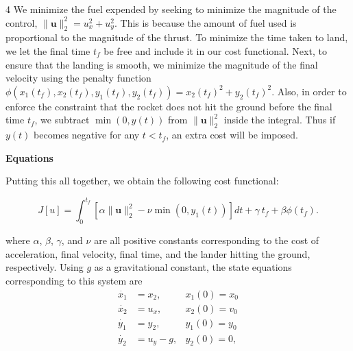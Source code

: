 \documentclass[a0]{4by3}
\newcommand{\NumColumns}{4}
\begin{document}
\begin{minipage}{\linewidth + 2\fboxsep}
\begin{multicols*}{\NumColumns}
            We minimize the fuel expended by seeking to minimize the magnitude of the control, $\|\mathbf{u}\|_2^2 = u_x^2 + u_y^2$.
            This is because the amount of fuel used is proportional to the magnitude of the thrust.
            To minimize the time taken to land, we let the final time $t_f$ be free and include it in our cost functional.
            Next, to ensure that the landing is smooth, we minimize the magnitude of the final velocity using the penalty function $\phi(x_1(t_f), x_2(t_f), y_1(t_f), y_2(t_f)) = x_2(t_f)^2 + y_2(t_f)^2$. 
            Also, in order to enforce the constraint that the rocket does not hit the ground before the final time $t_f$, we subtract $\min(0, y(t))$ from $\|\mathbf{u}\|_2^2$ inside the integral. Thus if $y(t)$ becomes negative for any $t < t_f$, an extra cost will be imposed.

            \begin{tcolorbox}
        \begin{center}
        \color{white}
            {\ocra\LARGE{\textbf{Equations}}}
        \end{center}
        \end{tcolorbox}
            Putting this all together, we obtain the following cost functional:

            
\[
    J[u] = \int_{0}^{t_f} \left[\alpha \|\mathbf{u}\|_2^2 - \nu\min(0, y_1(t))\right] dt + \gamma\ t_f + \beta \phi(t_f).
\]


where $\alpha$, $\beta$, $\gamma$, and $\nu$ are all positive constants corresponding to the cost of acceleration, final velocity, final time, and the lander hitting the ground, respectively.
Using $g$ as a gravitational constant, the state equations corresponding to this system are
\begin{align*}
    \dot{x_1} &= x_2, & x_1(0) = x_0 \\
    \dot{x_2} &= u_x, & x_2(0) = v_0 \\
    \dot{y_1} &= y_2, & y_1(0) = y_0 \\
    \dot{y_2} &= u_y - g, & y_2(0) = 0,
\end{align*}


\end{multicols*}
\end{minipage}
\end{document}
